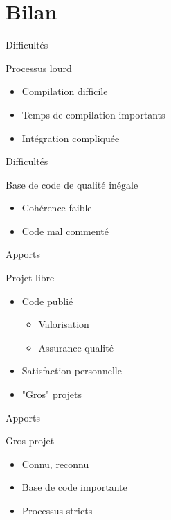 \documentclass[handout]{beamer}
\begin{document}
\section{Bilan}
\begin{frame}{Difficultés}
    \begin{block}{Processus lourd}
        \begin{itemize}[<+->]
            \item Compilation difficile
            \item Temps de compilation importants
            \item Intégration compliquée
        \end{itemize}
    \end{block}
\end{frame}

\begin{frame}{Difficultés}
    \begin{block}{Base de code de qualité inégale}
        \begin{itemize}[<+->]
            \item Cohérence faible
            \item Code mal commenté
        \end{itemize}
    \end{block}
\end{frame}

\begin{frame}{Apports}
    \begin{block}{Projet libre}
        \begin{itemize}[<+->]
            \item Code publié
            \begin{itemize}[<+->]
                \item Valorisation
                \item Assurance qualité
            \end{itemize}
            \item Satisfaction personnelle
            \item "Gros" projets
        \end{itemize}
    \end{block}
\end{frame}

\begin{frame}{Apports}
    \begin{block}{Gros projet}
        \begin{itemize}[<+->]
            \item Connu, reconnu
            \item Base de code importante
            \item Processus stricts
        \end{itemize}
    \end{block}
\end{frame}
\end{document}
